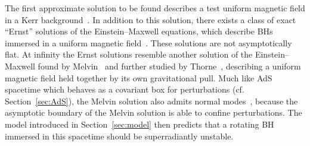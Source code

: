 \documentclass[11pt]{article}
\numberwithin{equation}{section} %
\begin{document}
The first approximate solution to be found describes a test uniform magnetic field in a Kerr background~\cite{Wald:1974np}. In addition to this solution, there exists a class of exact ``Ernst'' solutions of the Einstein--Maxwell equations, which describe BHs immersed in a uniform magnetic field~\cite{Ernst:1976BHM}. These solutions are not asymptotically flat. At infinity the Ernst solutions resemble another solution of the Einstein--Maxwell found by Melvin~\cite{Melvin:1963qx,Melvin:1965zza} and further studied by Thorne~\cite{PhysRev.139.B244}, describing a uniform magnetic field held together by its own gravitational pull. Much like AdS spacetime which behaves as a covariant box for perturbations (cf. Section~\ref{sec:AdS}), the Melvin solution also admits normal modes~\cite{Brito:2014nja}, because the asymptotic boundary of the Melvin solution is able to confine perturbations. The model introduced in Section~\ref{sec:model} then predicts that a rotating BH immersed in this spacetime should be superradiantly unstable.  
\end{document}
